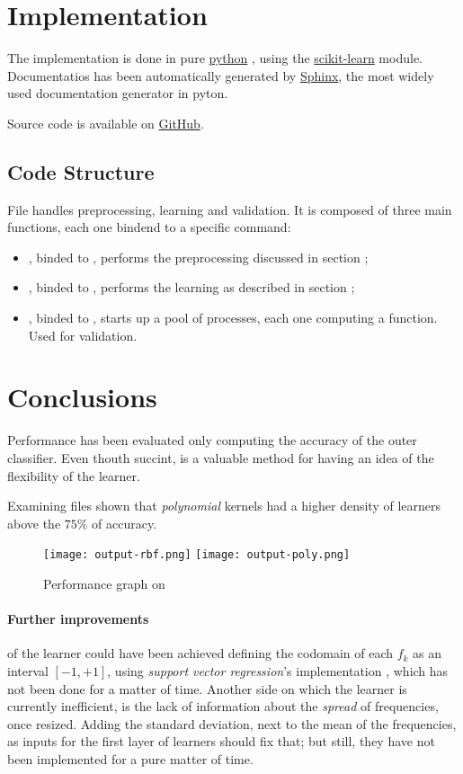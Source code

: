 \documentclass[10pt]{article}
\begin{document}
\section{Implementation}
The implementation is done in pure 
\href{https://python.org/}{python}
, using the
\href{http://scikit-learn.org/stable/}{scikit-learn}
module. Documentatios has been automatically generated by
\href{http://sphinx-doc.org/}{Sphinx}, the most widely used documentation generator in pyton.

Source code is available on 
\href{https://github.com/mmaker/braindecoding}{GitHub}.

\subsection{Code Structure}
File  handles preprocessing, learning and validation. It is composed of three main functions, each one bindend to a specific command: 
\begin{itemize}
\item {}, binded to , performs the preprocessing discussed in section ;
\item {}, binded to , performs the learning as described in section ;
\item {}, binded to , starts up a pool of processes, each one computing a  function. Used for validation.
\end{itemize}

\section{Conclusions}
Performance has been evaluated only computing the accuracy of the outer classifier. Even thouth succint, is a valuable method for having an idea of the flexibility of the learner.

Examining files  shown that \emph{polynomial} kernels had a higher density of learners above the $75\%$ of accuracy.

\begin{figure}[H]
\texttt{[image: output-rbf.png]}
\hfill
\texttt{[image: output-poly.png]}
\hfill
\caption{Performance graph on }
\end{figure}

\paragraph{Further improvements} of the learner could have been achieved defining the codomain of each $f_k$ as an interval $[-1, +1]$, using \emph{support vector regression}'s implementation , which has not been done for a matter of time.
Another side on which the learner is currently inefficient, is the lack of information about the \emph{spread} of frequencies, once resized. Adding the standard deviation, next to the mean of the frequencies, as inputs for the first layer of learners should fix that; but still, they have not been implemented for a pure matter of time.
\end{document}
